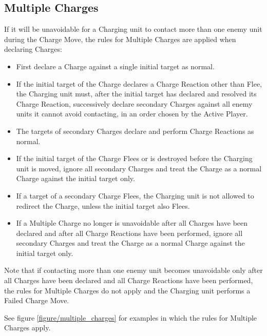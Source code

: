 \newpage
\subsection{Multiple Charges}
\label{multiple_charges}

If it will be unavoidable for a Charging unit to contact more than one enemy unit during the Charge Move, the rules for Multiple Charges are applied when declaring Charges:

\begin{itemize}
\item First declare a Charge against a single initial target as normal.
\item If the initial target of the Charge declares a Charge Reaction other than Flee, the Charging unit must, after the initial target has declared and resolved its Charge Reaction, successively declare secondary Charges against all enemy units it cannot avoid contacting, in an order chosen by the Active Player.
\item The targets of secondary Charges declare and perform Charge Reactions as normal.
\item If the initial target of the Charge Flees or is destroyed before the Charging unit is moved, ignore all secondary Charges and treat the Charge as a normal Charge against the initial target only.
\item If a target of a secondary Charge Flees, the Charging unit is not allowed to redirect the Charge, unless the initial target also Flees.
\item If a Multiple Charge no longer is unavoidable after all Charges have been declared and after all Charge Reactions have been performed, ignore all secondary Charges and treat the Charge as a normal Charge against the initial target only.
\end{itemize}

Note that if contacting more than one enemy unit becomes unavoidable only after all Charges have been declared and all Charge Reactions have been performed, the rules for Multiple Charges do not apply and the Charging unit performs a Failed Charge Move.

See figure \ref{figure/multiple_charges} for examples in which the rules for Multiple Charges apply.

\newcommand{\figMulChaA}{a)}
\newcommand{\figMulChaB}{b)}
\newcommand{\figMulChaOne}{1}
\newcommand{\figMulChaTwo}{2}
\newcommand{\figMulChaCharge}{\smallfontsize\flufffont{Charge!}}

